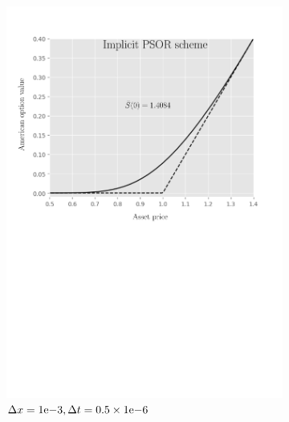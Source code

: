 \begin{figure}[tbp]
\begin{subfigure}{0.4\textwidth}
    \includegraphics[width=\textwidth]{chapters/chapter5/TestCase3ImplicitLCP.pdf}
    \caption{$\Delta{x}={1}\mathrm{e}{-3}, \Delta{t}=0.5\times{1}\mathrm{e}{-6}$}
    \label{fig:lcp:numericaresults:test_case_3_implicit}
  \end{subfigure}
  \hspace{0.5cm}
  \begin{subfigure}{0.4\textwidth}
    \label{fig:lcp:numericaresults:test_case_3_crank_nicholson}
    \centering

\end{subfigure}
\end{figure}
